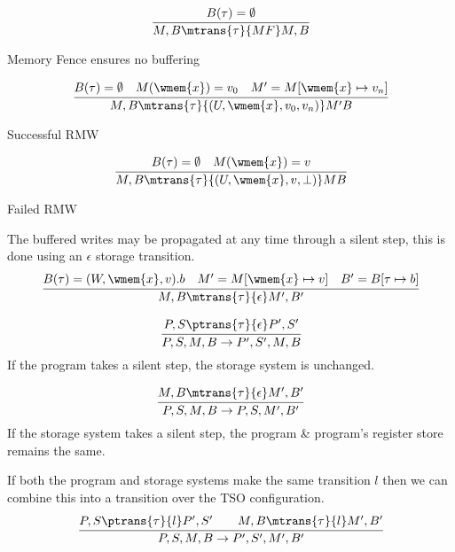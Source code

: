 \\ \begin{minipage}[b]{.33\textwidth}
	\[\cfrac{B(\tau) = \emptyset}{M,B \mtrans{\tau}{MF}M, B}\]
	\centerline{Memory Fence ensures no buffering}
\end{minipage}
\begin{minipage}[b]{.33\textwidth}
	\[\cfrac{
			B(\tau) = \emptyset \quad M(\wmem{x}) = v_0 \quad M' = M[\wmem{x} \mapsto v_n]
		}{
			M, B \mtrans{\tau}{(U, \wmem{x}, v_0, v_n)} M' B
		}\]
	\centerline{Successful RMW}
\end{minipage}
\begin{minipage}[b]{.33\textwidth}
	\[\cfrac{
			B(\tau) = \emptyset \quad M(\wmem{x}) = v
		}{
			M, B \mtrans{\tau}{(U, \wmem{x}, v, \bot)} M B
		}\]
	\centerline{Failed RMW}
\end{minipage}
\vspace{5mm}
The buffered writes may be propagated at any time through a silent step, this is done using an $\epsilon$ storage transition.
\[\cfrac{
		B(\tau) = (W, \wmem{x}, v).b \quad M' = M[\wmem{x} \mapsto v] \quad B' = B[\tau \mapsto b]
	}{
		M, B \mtrans{\tau}{\epsilon} M', B'
	}\]

\begin{minipage}[b]{.48\textwidth}
	\[\cfrac{
			P, S \ptrans{\tau}{\epsilon} P', S'
		}{
			P, S, M, B \to P', S', M, B
		}\]
	If the program takes a silent step, the storage system is unchanged.
\end{minipage}
\hfill
\vline
\hfill
\begin{minipage}[b]{.45\textwidth}
	\[\cfrac{
			M, B \mtrans{\tau}{\epsilon} M', B'
		}{
			P, S, M, B \to P, S, M', B'
		}\]
	If the storage system takes a silent step, the program \& program's register store remains the same.
\end{minipage}
\vspace{5mm}
If both the program and storage systems make the same transition $l$ then we can combine this into a transition over the TSO configuration.
\[\cfrac{
		P, S \ptrans{\tau}{l} P', S' \qquad M, B \mtrans{\tau}{l} M', B'
	}{
		P, S, M, B \to P', S', M', B'
	}\]

